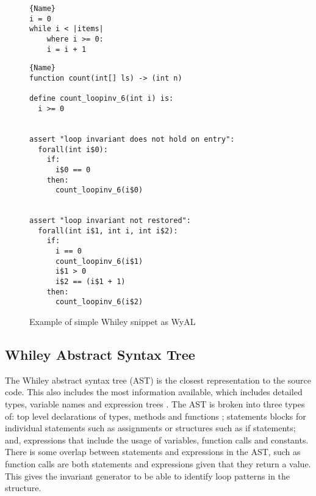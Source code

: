 \begin{figure}
\noindent\begin{minipage}{.45\textwidth}
\begin{lstlisting}[caption={Whiley Code},frame=tlrb,numbers=none]{Name}
i = 0
while i < |items|
    where i >= 0:
    i = i + 1
\end{lstlisting}
\end{minipage}\hfill
\begin{minipage}{.45\textwidth}
\begin{lstlisting}[caption={WyAL Code},frame=tlrb,numbers=none,breaklines=true]{Name}
function count(int[] ls) -> (int n)

define count_loopinv_6(int i) is:
  i >= 0


assert "loop invariant does not hold on entry":
  forall(int i$0):
    if:
      i$0 == 0
    then:
      count_loopinv_6(i$0)


assert "loop invariant not restored":
  forall(int i$1, int i, int i$2):
    if:
      i == 0
      count_loopinv_6(i$1)
      i$1 > 0
      i$2 == (i$1 + 1)
    then:
      count_loopinv_6(i$2)
\end{lstlisting}
\end{minipage}
    \caption{Example of simple Whiley snippet as WyAL}
    \label{lst:design-wyal}
\end{figure}

\subsection{Whiley Abstract Syntax Tree}

The Whiley abstract syntax tree (AST) is the closest representation to
the source code.
This also includes the most information available, which includes detailed
types, variable names and expression trees \cite{whiley-origin}.
The AST is broken into three types of: top level declarations of types,
methods and functions ; statements blocks for individual statements
such as assignments or structures such as if statements; and, expressions
that include the usage of variables, function calls and constants.
There is some overlap between statements and expressions in the AST,
such as function calls are both statements and expressions given that they
return a value.
This gives the invariant generator to be able to identify loop patterns in the
structure.

